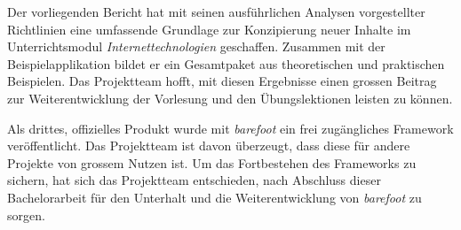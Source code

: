 Der vorliegenden Bericht hat mit seinen ausführlichen Analysen vorgestellter Richtlinien eine umfassende Grundlage zur Konzipierung neuer Inhalte im Unterrichtsmodul \emph{Internettechnologien} geschaffen. Zusammen mit der Beispielapplikation bildet er ein Gesamtpaket aus theoretischen und praktischen Beispielen. Das Projektteam hofft, mit diesen Ergebnisse einen grossen Beitrag zur Weiterentwicklung der Vorlesung und den Übungslektionen leisten zu können.

Als drittes, offizielles Produkt wurde mit \emph{barefoot} ein frei zugängliches Framework veröffentlicht. Das Projektteam ist davon überzeugt, dass diese für andere Projekte von grossem Nutzen ist. Um das Fortbestehen des Frameworks zu sichern, hat sich das Projektteam entschieden, nach Abschluss dieser Bachelorarbeit für den Unterhalt und die Weiterentwicklung von \emph{barefoot} zu sorgen.
